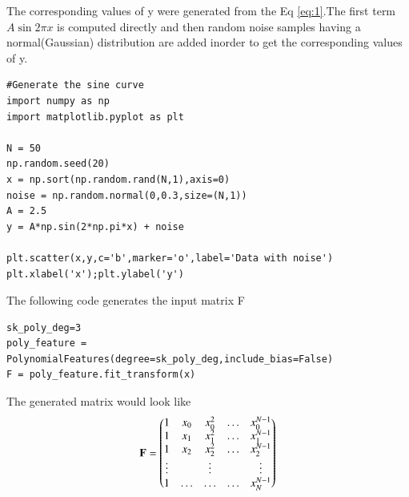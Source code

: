 \documentclass[journal,12pt,twocolumn]{IEEEtran}
\begin{document}
The corresponding values of y were generated from the Eq \eqref{eq:1}.The first term $A\sin{2\pi x}$ is computed directly and then random noise samples having a normal(Gaussian) distribution are added inorder to get the corresponding values of y.
\begin{lstlisting}
#Generate the sine curve 
import numpy as np
import matplotlib.pyplot as plt

N = 50
np.random.seed(20)
x = np.sort(np.random.rand(N,1),axis=0)
noise = np.random.normal(0,0.3,size=(N,1))
A = 2.5
y = A*np.sin(2*np.pi*x) + noise

plt.scatter(x,y,c='b',marker='o',label='Data with noise')
plt.xlabel('x');plt.ylabel('y')
\end{lstlisting}

The following code generates the input matrix F
\begin{lstlisting}
sk_poly_deg=3
poly_feature = PolynomialFeatures(degree=sk_poly_deg,include_bias=False)
F = poly_feature.fit_transform(x)
\end{lstlisting}

The generated matrix would look like
\begin{align}
    \mathbf{F}= \begin{pmatrix} 1 & x_{0} & x_{0}^2 & \ldots & x_{0}^{N-1} \\
		1 & x_{1} & x_{1}^2 & \ldots & x_{1}^{N-1} \\
		1 & x_{2} & x_{2}^2 & \ldots & x_{2}^{N-1} \\
		\vdots & & \vdots &  & \vdots  \\
		    1 & \ldots & \ldots & \ldots & x_{N}^{N-1} \end{pmatrix}\label{eq:12}
\end{align}
\end{document}
